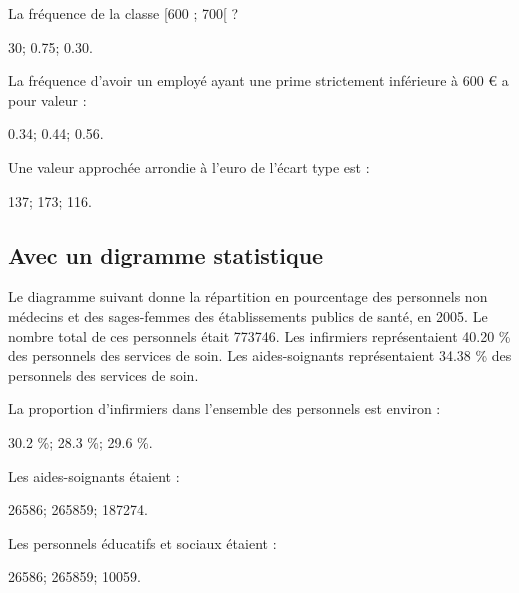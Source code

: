 \begin{questions}
	\question La fréquence de la classe [600 ; 700[ ?
	
	\begin{oneparchoices}
		\choice \num{30};
		\choice \num{0.75};
		\CorrectChoice \num{0.30}.
	\end{oneparchoices} 

	\question La fréquence d'avoir un employé ayant une prime strictement inférieure à 600 € a pour valeur :
	
	\begin{oneparchoices}
		\choice \num{0.34};
		\CorrectChoice \num{0.44};
		\choice \num{0.56}.
	\end{oneparchoices} 

	\question Une valeur approchée arrondie à l'euro de l'écart type est :
	
	\begin{oneparchoices}
		\choice \num{137};
		\choice \num{173};
		\CorrectChoice \num{116}.
	\end{oneparchoices} 
\end{questions}  

\subsection{Avec un digramme statistique}

Le diagramme suivant donne la répartition en pourcentage des personnels non médecins et des sages-femmes des établissements publics de santé, en 2005.
Le nombre total de ces personnels était \num{773746}.
Les infirmiers représentaient \num{40.20} \% des personnels des services de soin. Les aides-soignants représentaient \num{34.38} \% des personnels des services de soin.

\begin{questions}
	\question La proportion d'infirmiers dans l'ensemble des personnels est environ :
	
	\begin{oneparchoices}
		\choice \num{30.2} \%;
		\CorrectChoice \num{28.3} \%;
		\choice \num{29.6} \%.
		
	\end{oneparchoices} 

	\question Les aides-soignants étaient :
	
	\begin{oneparchoices}
		\choice \num{26586};
		\choice \num{265859};
		\CorrectChoice \num{187274}.
		
	\end{oneparchoices} 

	\question Les personnels éducatifs et sociaux étaient :
	
	\begin{oneparchoices}
		\choice \num{26586};
		\choice \num{265859};
		\CorrectChoice \num{10059}.
		
	\end{oneparchoices} 
\end{questions}